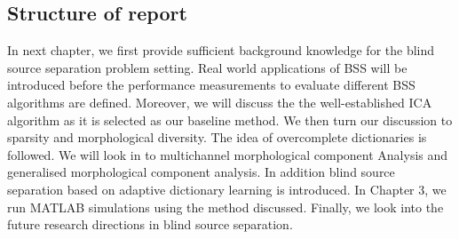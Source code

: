 \subsection{Structure of report}
In next chapter, we first provide sufficient background knowledge for the blind source separation problem setting. Real world applications of BSS will be introduced before the performance measurements to evaluate different BSS algorithms are defined. Moreover, we will discuss the the well-established ICA algorithm as it is selected as our baseline method. We then turn our discussion to sparsity and morphological diversity. The idea of overcomplete dictionaries is followed. We will look in to multichannel morphological component Analysis and generalised morphological component analysis. In addition blind source separation based on adaptive dictionary learning is introduced. In Chapter 3, we run MATLAB simulations using the method discussed. Finally, we look into the future research directions in blind source separation.
